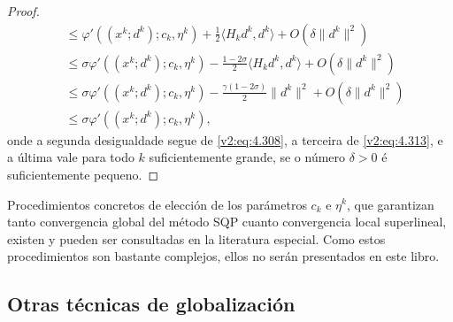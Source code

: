 \begin{proof}
\begin{align*}
        &\le \varphi'((x^k; d^k); c_k, \eta^k) + \frac{1}{2}\langle H_k d^k, d^k \rangle + O(\delta \|d^k\|^2) \\
        &\le \sigma \varphi'((x^k; d^k); c_k, \eta^k) - \frac{1 - 2\sigma}{2} \langle H_k d^k, d^k \rangle + O(\delta \|d^k\|^2) \\
        &\le \sigma \varphi'((x^k; d^k); c_k, \eta^k) - \frac{\gamma(1 - 2\sigma)}{2} \|d^k\|^2 + O(\delta \|d^k\|^2) \\
        &\le \sigma \varphi'((x^k; d^k); c_k, \eta^k),
    \end{align*}
    onde a segunda desigualdade segue de \eqref{v2:eq:4.308}, a terceira de \eqref{v2:eq:4.313}, e a última vale para todo $k$ suficientemente grande, se o número $\delta > 0$ é suficientemente pequeno.
\end{proof}

Procedimientos concretos de elección de los parámetros $c_k$ e $\eta^k$, que garantizan tanto convergencia global del método SQP cuanto convergencia local superlineal, existen y pueden ser consultadas en la literatura especial. Como estos procedimientos son bastante complejos, ellos no serán presentados en este libro.

\subsection{Otras técnicas de globalización}\label{v2:sec:4.6.5}

